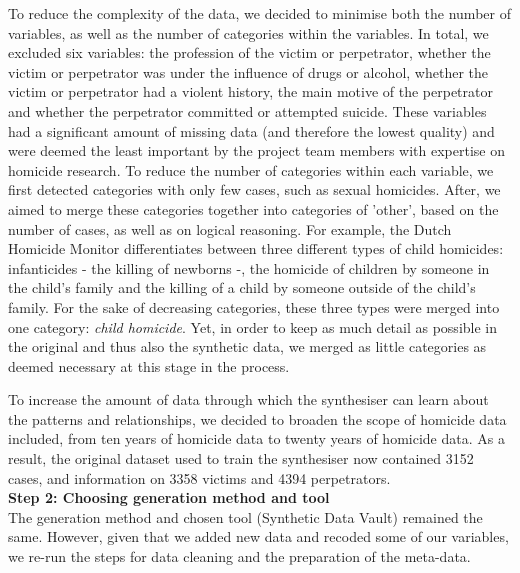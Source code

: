 To reduce the complexity of the data, we decided to minimise both the number of variables, as well as the number of categories within the variables. In total, we excluded six variables: the profession of the victim or perpetrator, whether the victim or perpetrator was under the influence of drugs or alcohol, whether the victim or perpetrator had a violent history, the main motive of the perpetrator and whether the perpetrator committed or attempted suicide. These variables had a significant amount of missing data (and therefore the lowest quality) and were deemed the least important by the project team members with expertise on homicide research. To reduce the number of categories within each variable, we first detected categories with only few cases, such as sexual homicides. After, we aimed to merge these categories together into categories of 'other', based on the number of cases, as well as on logical reasoning. For example, the Dutch Homicide Monitor differentiates between three different types of child homicides: infanticides - the killing of newborns -, the homicide of children by someone in the child's family and the killing of a child by someone outside of the child's family. For the sake of decreasing categories, these three types were merged into one category: \textit{child homicide}. Yet, in order to keep as much detail as possible in the original and thus also the synthetic data, we merged as little categories as deemed necessary at this stage in the process.

To increase the amount of data through which the synthesiser can learn about the patterns and relationships, we decided to broaden the scope of homicide data included, from ten years of homicide data to twenty years of homicide data. As a result, the original dataset used to train the synthesiser now contained 3152 cases, and information on 3358 victims and 4394 perpetrators. \\

\textbf{Step 2: Choosing generation method and tool}\\
The generation method and chosen tool (Synthetic Data Vault) remained the same. However, given that we added new data and recoded some of our variables, we re-run the steps for data cleaning and the preparation of the meta-data.


